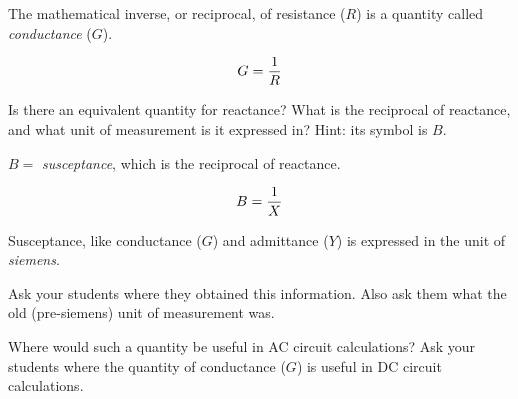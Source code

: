 

The mathematical inverse, or reciprocal, of resistance ($R$) is a quantity called {\it conductance} ($G$).

$$G = {1 \over R}$$

Is there an equivalent quantity for reactance?  What is the reciprocal of reactance, and what unit of measurement is it expressed in?  Hint: its symbol is $B$.







$B =$ {\it susceptance}, which is the reciprocal of reactance.

$$B = {1 \over X}$$

Susceptance, like conductance ($G$) and admittance ($Y$) is expressed in the unit of {\it siemens}.







Ask your students where they obtained this information.  Also ask them what the old (pre-siemens) unit of measurement was.

Where would such a quantity be useful in AC circuit calculations?  Ask your students where the quantity of conductance ($G$) is useful in DC circuit calculations.




